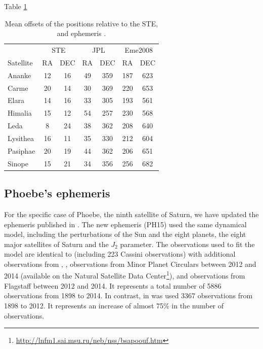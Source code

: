 \documentclass[useAMS,usenatbib]{mn2e}
\begin{document}
Table \ref{Tab:STE-error}

\begin{table}
\caption{\label{Tab:STE-error} Mean offsets of the \protect\cite{GomesJunior2015} positions relative to the STE, \protect\cite{Jacobson2012} and \protect\cite{Emelyanov2008} ephemeris .}
\begin{centering}
\begin{tabular}{lcccccc}
\hline  \hline
 & \multicolumn{2}{c}{STE} & \multicolumn{2}{c}{JPL} & \multicolumn{2}{c}{Eme2008}\tabularnewline
Satellite  & RA & DEC & RA & DEC & RA & DEC \tabularnewline
\hline
Ananke & 12 & 16 & 49 & 359 & 187 & 623 \tabularnewline
Carme & 20 & 14 & 30 & 369 & 220 & 653 \tabularnewline
Elara & 14 & 16 & 33 & 305 & 193 & 561 \tabularnewline
Himalia & 15 & 12 & 54 & 257 & 230 & 568 \tabularnewline
Leda & 8 & 24 & 38 & 362 & 208 & 640 \tabularnewline
Lysithea & 16 & 11 & 35 & 330 & 212 & 604 \tabularnewline
Pasiphae & 20 & 19 & 44 & 362 & 206 & 651 \tabularnewline
Sinope & 15 & 21 & 34 & 356 & 256 & 682 \tabularnewline
\hline
\end{tabular}
\par \end{centering}
\end{table}



\subsection{Phoebe's ephemeris}

For the specific case of Phoebe, the ninth satellite of Saturn, we have updated the ephemeris published in \cite{Desmars2013}. The new ephemeris (PH15) used the same dynamical model, including the perturbations of the Sun and the eight planets, the eight major satellites of Saturn and the $J_2$ parameter. The observations used to fit the model are identical to \cite{Desmars2013} (including 223 Cassini observations) with additional observations from \cite{GomesJunior2015}, \cite{Peng2015}, observations from Minor Planet Circulars between 2012 and 2014 (available on the Natural Satellite Data Center\footnote{\url{http://lnfm1.sai.msu.ru/neb/nss/bsapoouf.htm}}), and observations from Flagstaff \citep{NOFS} between 2012 and 2014. It represents a total number of 5886 observations from 1898 to 2014. In contrast, in \cite{Desmars2013} was used 3367 observations from 1898 to 2012. It represents an increase of almost 75\% in the number of observations.
\end{document}
